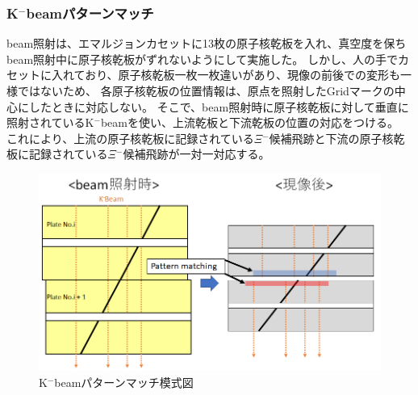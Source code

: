 \documentclass[12pt,a4paper]{jarticle}
\begin{document}
\subsubsection{K$^-$beamパターンマッチ}
beam照射は、エマルジョンカセットに13枚の原子核乾板を入れ、真空度を保ちbeam照射中に原子核乾板がずれないようにして実施した。
しかし、人の手でカセットに入れており、原子核乾板一枚一枚違いがあり、現像の前後での変形も一様ではないため、
各原子核乾板の位置情報は、原点を照射したGridマークの中心にしたときに対応しない。
そこで、beam照射時に原子核乾板に対して垂直に照射されているK$^-$beamを使い、上流乾板と下流乾板の位置の対応をつける。
これにより、上流の原子核乾板に記録されている$\Xi$$^-$候補飛跡と下流の原子核乾板に記録されている$\Xi$$^-$候補飛跡が一対一対応する。
\begin{figure}[htbp]
  \centering
     \includegraphics[width=120mm]{beam_mosikizu.png}
  \caption{K$^-$beamパターンマッチ模式図\label{fig:beam_mosikizu}}
\end{figure}
\end{document}
